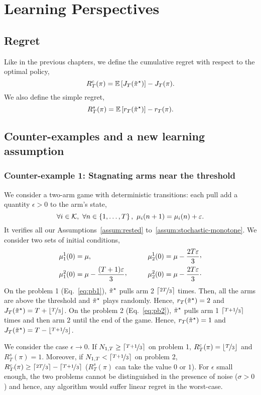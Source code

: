 \section{Learning Perspectives}
\subsection{Regret}
Like in the previous chapters, we define the cumulative regret with respect to the optimal policy, 
\[
R^c_T(\pi) = \mathbb{E}\left[J_T(\Tilde{\pi}^\star)\right] - J_T(\pi).
\]
We also define the simple regret, 
\[
R^s_T(\pi) = \mathbb{E}\left[r_T(\Tilde{\pi}^\star)\right] - r_T(\pi).
\]
\subsection{Counter-examples and a new learning assumption}
\subsubsection{Counter-example 1: Stagnating arms near the threshold}
We consider a two-arm game with deterministic transitions: each pull add a quantity $\epsilon>0$ to the arm's state, 
\[
\forall i \in \mathcal{K},\  \forall n \in \left\{1, \dots, T\right\},\ \mu_i(n+1) = \mu_i(n) + \varepsilon.
\]
It verifies all our Assumptions~\ref{assum:rested} to~\ref{assum:stochastic-monotone}. We consider two sets of initial conditions, 
\begin{align}
&\mu_1^1(0) = \mu, \qquad &\mu_2^1(0) = \mu - \frac{2T\epsilon}{3} \CommaBin\label{eq:pb1}\\
&\mu_1^2(0) = \mu - \frac{(T+1)\epsilon}{3}\CommaBin \qquad &\mu_2^2(0) = \mu - \frac{2T\epsilon}{3}\cdot\label{eq:pb2}
\end{align}
On the problem 1 (Eq.~\ref{eq:pb1}), $\Tilde{\pi}^\star$ pulls arm 2 $\left\lceil\nicefrac{2T}{3}\right\rceil$ times. Then, all the arms are above the threshold and $\Tilde{\pi}^\star$ plays randomly. Hence, $r_T(\Tilde{\pi}^\star)=2$ and $J_T(\Tilde{\pi}^\star) = T +  \left\lfloor\nicefrac{T}{3}\right\rfloor$. On the problem 2 (Eq.~\ref{eq:pb2}), $\Tilde{\pi}^\star$ pulls arm 1 $\left\lceil\nicefrac{T+1}{3}\right\rceil$ times and then arm $2$ until the end of the game. Hence, $r_T(\Tilde{\pi}^\star)=1$ and $J_T(\Tilde{\pi}^\star) = T -  \left\lfloor\nicefrac{T+1}{3}\right\rfloor$.

We consider the case $\epsilon \rightarrow 0$.  If $N_{1,T} \geq \left\lceil\nicefrac{T+1}{3}\right\rceil$ on problem 1, $R^c_T(\pi)= \left\lfloor\nicefrac{T}{3}\right\rfloor$ and $R^s_T(\pi)= 1$. Moreover, if $N_{1,T} < \left\lceil\nicefrac{T+1}{3}\right\rceil$ on problem 2, $R^c_T(\pi)\geq \left\lceil\nicefrac{2T}{3}\right\rceil - \left\lceil\nicefrac{T+1}{3}\right\rceil$ ($R^s_T(\pi)$ can take the value $0$ or $1$). For $\epsilon$ small enough, the two problems cannot be distinguished in the presence of noise ($\sigma >0$) and hence, any algorithm would suffer linear regret in the worst-case.

